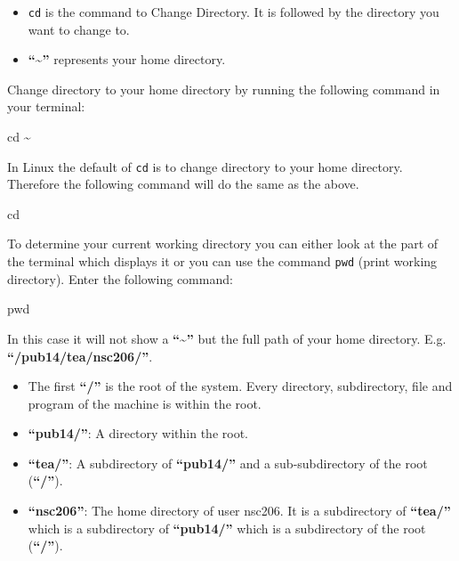\documentclass[
  letterpaper,
  DIV=11,
  numbers=noendperiod]{scrreprt}
\newenvironment{Shaded}{\begin{snugshade}}{\end{snugshade}}
\newcommand{\BuiltInTok}[1]{\textcolor[rgb]{0.00,0.23,0.31}{#1}}
\newcommand{\NormalTok}[1]{\textcolor[rgb]{0.00,0.23,0.31}{#1}}
\providecommand{\tightlist}{%
  \setlength{\itemsep}{0pt}\setlength{\parskip}{0pt}}
\begin{document}
\begin{itemize}
\tightlist
\item
  \texttt{cd} is the command to Change Directory. It is followed by the
  directory you want to change to.
\item
  \textbf{``\textasciitilde{}''} represents your home directory.
\end{itemize}

Change directory to your home directory by running the following command
in your terminal:

\begin{Shaded}
\begin{Highlighting}[]
\BuiltInTok{cd}\NormalTok{ \textasciitilde{} }
\end{Highlighting}
\end{Shaded}

In Linux the default of \texttt{cd} is to change directory to your home
directory. Therefore the following command will do the same as the
above.

\begin{Shaded}
\begin{Highlighting}[]
\BuiltInTok{cd}
\end{Highlighting}
\end{Shaded}

To determine your current working directory you can either look at the
part of the terminal which displays it or you can use the command
\texttt{pwd} (print working directory). Enter the following command:

\begin{Shaded}
\begin{Highlighting}[]
\BuiltInTok{pwd}
\end{Highlighting}
\end{Shaded}

In this case it will not show a \textbf{``\textasciitilde{}''} but the
full path of your home directory. E.g. \textbf{``/pub14/tea/nsc206/''}.

\begin{itemize}
\tightlist
\item
  The first \textbf{``/''} is the root of the system. Every directory,
  subdirectory, file and program of the machine is within the root.
\item
  \textbf{``pub14/''}: A directory within the root.
\item
  \textbf{``tea/''}: A subdirectory of \textbf{``pub14/''} and a
  sub-subdirectory of the root (\textbf{``/''}).
\item
  \textbf{``nsc206''}: The home directory of user nsc206. It is a
  subdirectory of \textbf{``tea/''} which is a subdirectory of
  \textbf{``pub14/''} which is a subdirectory of the root
  (\textbf{``/''}).
\end{itemize}
\end{document}

